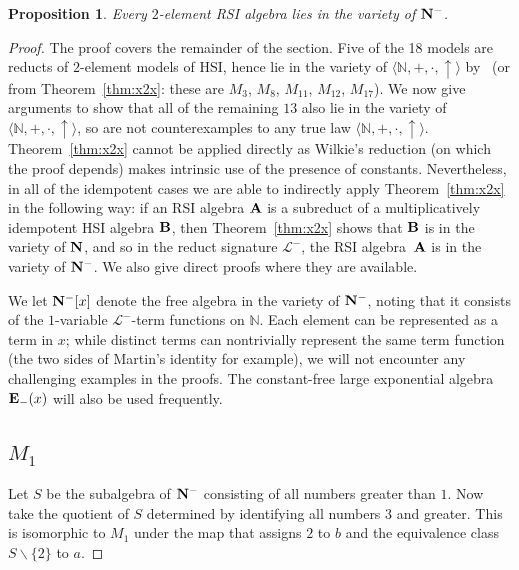 \documentclass[eqnor,reqno]{amsart}
\theoremstyle{plain}
\newtheorem{pro}[thm]{Proposition}
\theoremstyle{definition}
\newcommand{\HSI}{\textsf{HSI}}
\begin{document}
\begin{pro}\label{pro:2RSI}
Every $2$-element RSI algebra lies in the variety of ${\bf N}^-$.
\end{pro}
\begin{proof} The proof covers the remainder of the section.
 Five of the 18 models are reducts of $2$-element models of \HSI, hence lie in the variety of $\langle \mathbb{N},+,\cdot,\uparrow\rangle$ by~\cite{asa} (or from Theorem~\ref{thm:x2x}: these are $M_3$, $M_8$, $M_{11}$, $M_{12}$, $M_{17}$).  
 We now give arguments to show that all of the remaining $13$ also lie in the variety of $\langle \mathbb{N},+,\cdot,\uparrow\rangle$, so are not counterexamples to any true law $\langle \mathbb{N},+,\cdot,\uparrow\rangle$.  
 Theorem~\ref{thm:x2x} cannot be applied directly as Wilkie's reduction (on which the proof depends) makes intrinsic use of the presence of constants.
Nevertheless, in all of the idempotent cases we are able to indirectly apply Theorem~\ref{thm:x2x} in the following way: if an RSI algebra ${\bf A}$ is a subreduct of a multiplicatively idempotent HSI algebra ${\bf B}$, then Theorem~\ref{thm:x2x} shows that ${\bf B}$ is in the variety of ${\bf N}$, and so in the reduct signature $\mathscr{L}^-$, the RSI algebra~${\bf A}$ is in the variety of ${\bf N}^-$.  
We also give direct proofs where they are available.  
 
 We let ${\bf N}^-[x]$ denote the free algebra in the variety of ${\bf N}^-$, noting that it consists of the $1$-variable $\mathscr{L}^-$-term functions on $\mathbb{N}$.
Each element can be represented as a term in $x$; while distinct terms can nontrivially represent the same term function (the two sides of Martin's identity for example), we will not encounter any challenging examples in the proofs. 
 The constant-free large exponential algebra ${\bf E}_-(x)$ will also be used frequently.

\subsection{$M_1$}  Let $S$ be the subalgebra of ${\bf N}^-$ consisting of all numbers greater than $1$.  Now take the quotient of $S$ determined by identifying all numbers $3$ and greater.  This is isomorphic to $M_1$ under the map that assigns $2$ to $b$ and the equivalence class $S\backslash\{2\}$ to $a$.


\end{proof}
\end{document}
